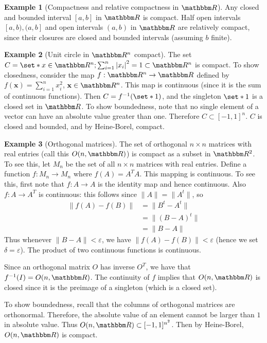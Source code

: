 \documentclass[12pt]{article}
\numberwithin{equation}{section}
\theoremstyle{plain}
\theoremstyle{definition}
\newtheorem{example}{\color{WildStrawberry}Example}[section]
\newcommand\abs[1]{\left| #1 \right|}
\newcommand\vect[1]{\mathbf{#1}}
\newcommand\inv[1]{#1^{-1}}
\newcommand\norm[1]{\lVert#1\rVert}
\def\Set{\set*}%
\newcommand{\1}{\mathbbm 1}
\def\d{\delta}
\newcommand{\e}{\varepsilon}
\def\vx{\vect{x}}
\newcommand{\RR}{\mathbbm R}
\begin{document}
\begin{example}[Compactness and relative compactness in $\RR$]
	Any closed and bounded interval $[a,b]$ in $\RR$ is compact. Half open intervals $[a,b), (a,b]$ and open intervals $(a,b)$ in $\RR$ are relatively compact, since their closures are closed and bounded intervals (assuming $b$ finite). 
\end{example}

\begin{example}[Unit circle in $\RR^n$ compact]
	The set $C = \Set{x \in \RR^n; \sum_{i=1}^n \abs{x_i}^2=1} \subset \RR^n$ is compact. To show closedness, consider the map $f: \RR^n \to \RR$ defined by $f(\vx) = \sum_{i=1}^n x_i^2$, $\vx \in \RR^n$. This map is continuous (since it is the sum of continuous functions). Then $C = f^{-1}(\Set{1})$, and the singleton $\Set{1}$ is a closed set in $\RR$. To show boundedness, note that no single element of a vector can have an absolute value greater than one. Therefore $C \subset [-1,1]^n$. $C$ is closed and bounded, and by Heine-Borel, compact. 
\end{example}


\begin{example}[Orthogonal matrices]
	The set of orthogonal $n \times n$ matrices with real entries (call this $O(n,\RR)$) is compact as a subset in $\RR^2$. To see this, let $M_n$ be the set of all $n\times n$ matrices with real entries. Define a function $f: M_n \to M_n$ where $f(A) = A^T A$. This mapping is continuous. To see this, first note that $f: A \to A$ is the identity map and hence continuous. Also $f: A \to A^T$ is continuous: this follows since $\norm{A} = \norm{A^t}$, so
	\begin{align*}
		\norm{f(A) - f(B)} &= \norm{B^t - A^t} \\
		&= \norm{(B - A)^t} \\
		&= \norm{B - A} 
	\end{align*}
	Thus whenever $\norm{B - A} < \e$, we have $\norm{f(A) - f(B)} < \e$ (hence we set $\d = \e$). The product of two continuous functions is continuous.  

	Since an orthogonal matrix $O$ has inverse $O^T$, we have that $\inv{f}(I) = O(n,\RR)$. The continuity of $f$ implies that $O(n,\RR)$ is closed since it is the preimage of a singleton (which is a closed set).

	To show boundedness, recall that the columns of orthogonal matrices are orthonormal. Therefore, the absolute value of an element cannot be larger than $1$ in absolute value. Thus $O(n,\RR) \subset [-1,1]^{n^2}$. Then by Heine-Borel, $O(n,\RR)$ is compact. 
\end{example}
\end{document}
